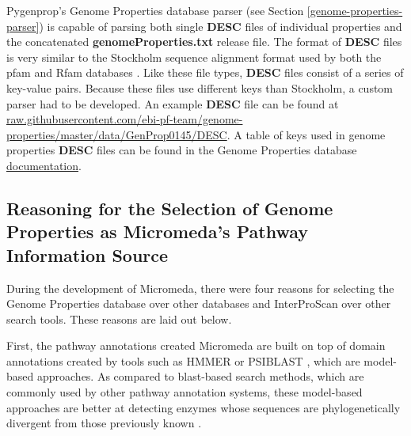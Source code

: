 Pygenprop's Genome Properties database parser (see Section \ref{genome-properties-parser}) is capable of parsing both single \textbf{DESC} files of individual properties and the concatenated \textbf{genomeProperties.txt} release file. The format of \textbf{DESC} files is very similar to the Stockholm sequence alignment format used by both the \gls{pfam} and Rfam databases \cite{bateman2004pfam, griffiths2003rfam}. Like these file types, \textbf{DESC} files consist of a series of key-value pairs. Because these files use different keys than Stockholm, a custom parser had to be developed. An example \textbf{DESC} file can be found at \href{raw.githubusercontent.com/ebi-pf-team/genome-properties/master/data/GenProp0145/DESC}{raw.githubusercontent.com/ebi-pf-team/genome-properties/master/data/GenProp0145/DESC}. A table of keys used in  genome properties \textbf{DESC} files can be found in the Genome Properties database \href{genome-properties.readthedocs.io/en/latest/flatfile.html\#desc-file}{documentation}.

\subsection{Reasoning for the Selection of Genome Properties as Micromeda's Pathway Information Source} \label{reason-for-genome-properties-selection}

During the development of Micromeda, there were four reasons for selecting the Genome Properties database over other databases and InterProScan over other search tools. These reasons are laid out below.

First, the pathway annotations created Micromeda are built on top of domain annotations created by tools such as HMMER \cite{eddy2011accelerated} or PSIBLAST \cite{altschul1997gapped}, which are model-based approaches. As compared to \gls{blast}-based \cite{altschul1990basic} search methods, which are commonly used by other pathway annotation systems, these model-based approaches are better at detecting enzymes whose sequences are phylogenetically divergent from those previously known \cite{eddy2011accelerated}.

